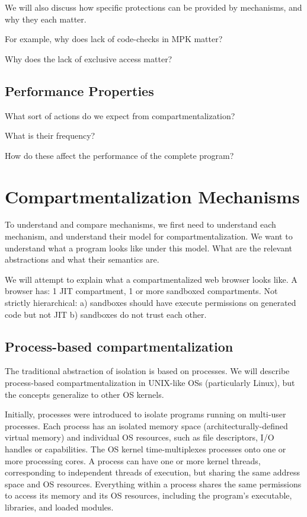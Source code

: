 We will also discuss how specific protections can be provided by mechanisms, and
why they each matter.

For example, why does lack of code-checks in MPK matter?

Why does the lack of exclusive access matter?

\subsection{Performance Properties}

What sort of actions do we expect from compartmentalization?

What is their frequency?

How do these affect the performance of the complete program?

\section{Compartmentalization Mechanisms}
\label{sec:comp}

To understand and compare mechanisms, we first need to understand each 
mechanism, and understand their model for compartmentalization.
We want to understand what a program looks like under this model.
What are the relevant abstractions and what their semantics are.

We will attempt to explain what a compartmentalized web browser looks like.
A browser has: 1 JIT compartment, 1 or more sandboxed compartments.
Not strictly hierarchical:
a) sandboxes should have execute permissions on generated code but not JIT
b) sandboxes do not trust each other.


\subsection{Process-based compartmentalization}

The traditional abstraction of isolation is based on processes.
We will describe process-based compartmentalization in UNIX-like OSs
(particularly Linux), 
but the concepts generalize to other OS kernels.

Initially, processes were introduced to isolate programs running on multi-user
processes.
Each process has an isolated memory space (architecturally-defined virtual memory)
and individual OS resources, such as file descriptors, I/O handles or capabilities.
The OS kernel time-multiplexes processes onto one or more processing cores.
A process can have one or more kernel threads, corresponding to independent threads
of execution, but sharing the same address space and OS resources.
Everything within a process shares the same permissions to access its memory and
its OS resources, including the program's executable, libraries, and loaded modules.

